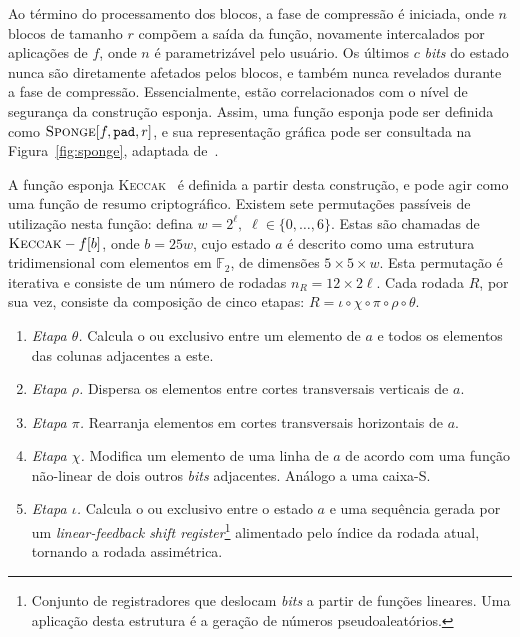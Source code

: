 \documentclass{ufsctex/ufsctex}
\begin{document}
Ao término do processamento dos blocos, a fase de compressão é iniciada, onde
$n$ blocos de tamanho $r$ compõem a saída da função, novamente intercalados por
aplicações de $f$, onde $n$ é parametrizável pelo usuário. Os últimos $c$
\emph{bits} do estado nunca são diretamente afetados pelos blocos, e também
nunca revelados durante a fase de compressão. Essencialmente, estão
correlacionados com o nível de segurança da construção esponja. Assim, uma
função esponja pode ser definida como $\textsc{Sponge}[f, \texttt{pad}, r]$, e
sua representação gráfica pode ser consultada na Figura~\ref{fig:sponge},
adaptada de~\cite{Jean:misc:2016:apr}.

A função esponja \textsc{Keccak}~\cite{Bertoni:misc:2011b:jan} é definida a
partir desta construção, e pode agir como uma função de resumo criptográfico.
Existem sete permutações passíveis de utilização nesta função: defina $w =
2^{\ell}, \; \ell \in \{0, \dots, 6\}$. Estas são chamadas de
$\textsc{Keccak}-f[b]$, onde $b = 25w$, cujo estado $a$ é descrito como uma
estrutura tridimensional com elementos em $\mathbb{F}_{2}$, de dimensões $5
\times 5 \times w$. Esta permutação é iterativa e consiste de um número de
rodadas $n_{R} = 12 \times 2 \ell$. Cada rodada $R$, por sua vez, consiste da
composição de cinco etapas: $R = \iota \circ \chi \circ \pi \circ \rho \circ
\theta$.

\begin{enumerate}

  \item[] \emph{Etapa $\theta$.} Calcula o ou exclusivo entre um elemento de
      $a$ e todos os elementos das colunas adjacentes a este.

  \item[] \emph{Etapa $\rho$.} Dispersa os elementos entre cortes transversais
      verticais de $a$.

  \item[] \emph{Etapa $\pi$.} Rearranja elementos em cortes transversais
      horizontais de $a$.

  \item[] \emph{Etapa $\chi$.} Modifica um elemento de uma linha de $a$ de
      acordo com uma função não-linear de dois outros \emph{bits} adjacentes.
        Análogo a uma caixa-S.

  \item[] \emph{Etapa $\iota$.} Calcula o ou exclusivo entre o estado $a$ e uma
      sequência gerada por um \emph{linear-feedback shift
        register}\footnote{Conjunto de registradores que deslocam \emph{bits} a
        partir de funções lineares. Uma aplicação desta estrutura é a geração
        de números pseudoaleatórios.} alimentado pelo índice da rodada atual,
        tornando a rodada assimétrica.

\end{enumerate}
\end{document}
